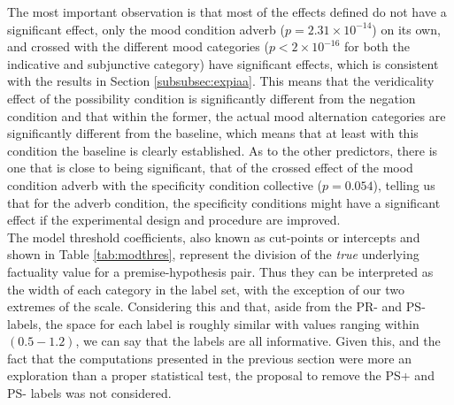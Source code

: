 The most important observation is that most of the effects defined do not have a significant effect, only the mood condition adverb ($p=2.31\times10^{-14}$) on its own, and crossed with the different mood categories ($p< 2\times10^{-16}$ for both the indicative and subjunctive category) have significant effects, which is consistent with the results in Section \ref{subsubsec:expiaa}. This means that the veridicality effect of the possibility condition is significantly different from the negation condition and that within the former, the actual mood alternation categories are significantly different from the baseline, which means that at least with this condition the baseline is clearly established. As to the other predictors, there is one that is close to being significant, that of the crossed effect of the mood condition adverb with the specificity condition collective ($p = 0.054$), telling us that for the adverb condition, the specificity conditions might have a significant effect if the experimental design and procedure are improved.\\

The model threshold coefficients, also known as cut-points or intercepts \citep{christensen2018cumulative} and shown in Table \ref{tab:modthres}, represent the division of the \textit{true} underlying factuality value for a premise-hypothesis pair. Thus they can be interpreted as the width of each category in the label set, with the exception of our two extremes of the scale. Considering this and that, aside from the PR- and PS- labels, the space for each label is roughly similar with values ranging within $(0.5-1.2)$, we can say that the labels are all informative. Given this, and the fact that the computations presented in the previous section were more an exploration than a proper statistical test, the proposal to remove the PS+ and PS- labels was not considered.\\ 

